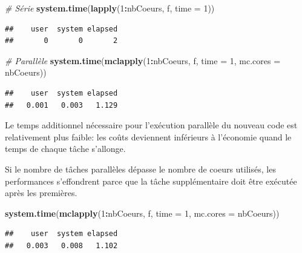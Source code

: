 \documentclass[
  12pt,
  french,
  a4paper,
  extrafontsizes,onecolumn,openright
  ]{memoir}
\newenvironment{Shaded}{\begin{snugshade}}{\end{snugshade}}
\newcommand{\CommentTok}[1]{\textcolor[rgb]{0.56,0.35,0.01}{\textit{#1}}}
\newcommand{\DataTypeTok}[1]{\textcolor[rgb]{0.13,0.29,0.53}{#1}}
\newcommand{\DecValTok}[1]{\textcolor[rgb]{0.00,0.00,0.81}{#1}}
\newcommand{\KeywordTok}[1]{\textcolor[rgb]{0.13,0.29,0.53}{\textbf{#1}}}
\newcommand{\NormalTok}[1]{#1}
\newcommand{\OperatorTok}[1]{\textcolor[rgb]{0.81,0.36,0.00}{\textbf{#1}}}
\newlength{\rf}
\begin{document}
\scriptsize

\begin{Shaded}
\begin{Highlighting}[]
\CommentTok{# Série}
\KeywordTok{system.time}\NormalTok{(}\KeywordTok{lapply}\NormalTok{(}\DecValTok{1}\OperatorTok{:}\NormalTok{nbCoeurs, f, }\DataTypeTok{time =} \DecValTok{1}\NormalTok{))}
\end{Highlighting}
\end{Shaded}

\begin{verbatim}
##    user  system elapsed 
##       0       0       2
\end{verbatim}

\begin{Shaded}
\begin{Highlighting}[]
\CommentTok{# Parallèle}
\KeywordTok{system.time}\NormalTok{(}\KeywordTok{mclapply}\NormalTok{(}\DecValTok{1}\OperatorTok{:}\NormalTok{nbCoeurs, f, }\DataTypeTok{time =} \DecValTok{1}\NormalTok{, }\DataTypeTok{mc.cores =}\NormalTok{ nbCoeurs))}
\end{Highlighting}
\end{Shaded}

\begin{verbatim}
##    user  system elapsed 
##   0.001   0.003   1.129
\end{verbatim}

\normalsize

Le temps additionnel nécessaire pour l'exécution parallèle du nouveau code est relativement plus faible: les coûts deviennent inférieurs à l'économie quand le temps de chaque tâche s'allonge.

Si le nombre de tâches parallèles dépasse le nombre de coeurs utilisés, les performances s'effondrent parce que la tâche supplémentaire doit être exécutée après les premières.

\scriptsize

\begin{Shaded}
\begin{Highlighting}[]
\KeywordTok{system.time}\NormalTok{(}\KeywordTok{mclapply}\NormalTok{(}\DecValTok{1}\OperatorTok{:}\NormalTok{nbCoeurs, f, }\DataTypeTok{time =} \DecValTok{1}\NormalTok{, }\DataTypeTok{mc.cores =}\NormalTok{ nbCoeurs))}
\end{Highlighting}
\end{Shaded}

\begin{verbatim}
##    user  system elapsed 
##   0.003   0.008   1.102
\end{verbatim}
\end{document}
